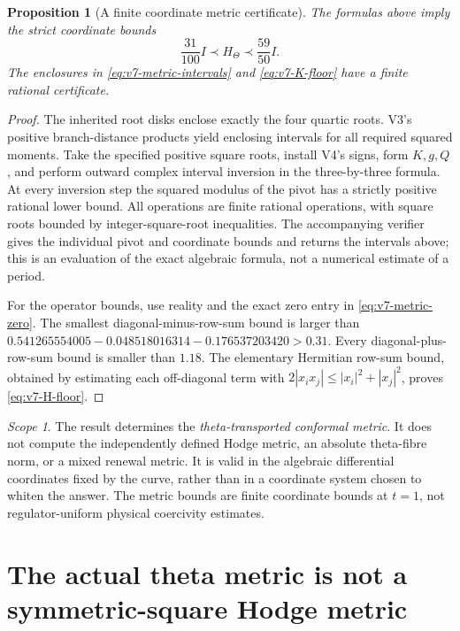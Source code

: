 \documentclass[11pt]{article}
\newtheorem{proposition}[proposition]{Proposition}
\theoremstyle{definition}
\theoremstyle{remark}
\newtheorem{scope}[scope]{Scope}
\begin{document}
\begin{proposition}[A finite coordinate metric certificate]
\label{prop:v7-H-bounds}
The formulas above imply the strict coordinate bounds
\begin{equation}
 \boxed{\frac{31}{100}I\prec H_\Theta\prec\frac{59}{50}I.}
 \label{eq:v7-H-floor}
\end{equation}
The enclosures in \eqref{eq:v7-metric-intervals} and
\eqref{eq:v7-K-floor} have a finite rational certificate.
\end{proposition}
\begin{proof}
The inherited root disks enclose exactly the four quartic roots. V3's positive
branch-distance products yield enclosing intervals for all required squared
moments. Take the specified positive square roots, install V4's signs, form
$K,g,Q$, and perform outward complex interval inversion in the three-by-three
formula. At every inversion step the squared modulus of the pivot has a
strictly positive rational lower bound. All operations are finite rational
operations, with square roots bounded by integer-square-root inequalities.
The accompanying verifier gives the individual pivot and coordinate bounds
and returns the intervals above; this is an evaluation of the exact algebraic
formula, not a numerical estimate of a period.

For the operator bounds, use reality and the exact zero entry in
\eqref{eq:v7-metric-zero}. The smallest diagonal-minus-row-sum bound is
larger than
$0.541265554005-0.048518016314-0.176537203420>0.31$.
Every diagonal-plus-row-sum bound is smaller than $1.18$. The elementary
Hermitian row-sum bound, obtained by estimating each off-diagonal term with
$2|x_i x_j|\le |x_i|^2+|x_j|^2$, proves
\eqref{eq:v7-H-floor}.
\end{proof}

\begin{scope}
The result determines the \emph{theta-transported conformal metric}. It does
not compute the independently defined Hodge metric, an absolute theta-fibre
norm, or a mixed renewal metric. It is valid in the algebraic differential
coordinates fixed by the curve, rather than in a coordinate system chosen to
whiten the answer. The metric bounds are finite coordinate bounds at $t=1$,
not regulator-uniform physical coercivity estimates.
\end{scope}

\section{The actual theta metric is not a symmetric-square Hodge metric}
\label{sec:v7-product-metric}
\end{document}
